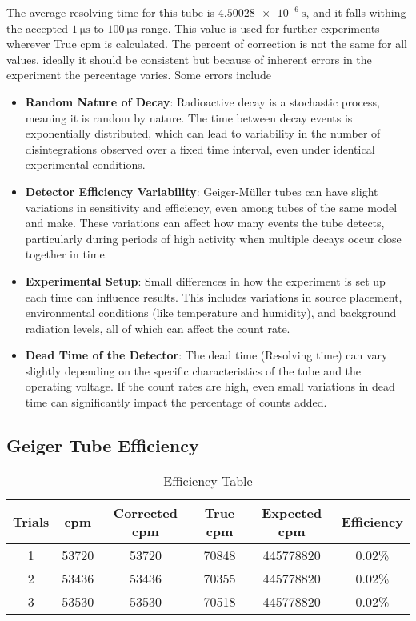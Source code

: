 \documentclass[11pt]{article}
\begin{document}
	The average resolving time for this tube is $\qty{4.50028e-6}{\second}$, and it falls withing the accepted $\qty{1}{\micro\second}$ to $\qty{100}{\micro\second}$ range. This value is used for further experiments wherever True cpm is calculated. The percent of correction is not the same for all values, ideally it should be consistent but because of inherent errors in the experiment the percentage varies. Some errors include
	\begin{itemize}
		\item \textbf{Random Nature of Decay}: Radioactive decay is a stochastic process, meaning it is random by nature. The time between decay events is exponentially distributed, which can lead to variability in the number of disintegrations observed over a fixed time interval, even under identical experimental conditions.
		\item \textbf{Detector Efficiency Variability}: Geiger-Müller tubes can have slight variations in sensitivity and efficiency, even among tubes of the same model and make. These variations can affect how many events the tube detects, particularly during periods of high activity when multiple decays occur close together in time.
		\item \textbf{Experimental Setup}: Small differences in how the experiment is set up each time can influence results. This includes variations in source placement, environmental conditions (like temperature and humidity), and background radiation levels, all of which can affect the count rate.
		\item \textbf{Dead Time of the Detector}: The dead time (Resolving time) can vary slightly depending on the specific characteristics of the tube and the operating voltage. If the count rates are high, even small variations in dead time can significantly impact the percentage of counts added.
	\end{itemize}
	
\clearpage

	\subsection{Geiger Tube Efficiency}
	
	\begin{table}[htbp]
		\centering
		\caption{Efficiency Table}
		\begin{tabular}{cccccc}
			\toprule
			Trials & cpm & Corrected cpm & True cpm & Expected cpm & Efficiency \\
			\midrule
			1 & 53720 & 53720 & 70848 & 445778820 & 0.02\% \\
			2 & 53436 & 53436 & 70355 & 445778820 & 0.02\% \\
			3 & 53530 & 53530 & 70518 & 445778820 & 0.02\% \\
			\bottomrule
		\end{tabular}%
		\label{tab:5_Table_1}%
	\end{table}%
	
\end{document}
